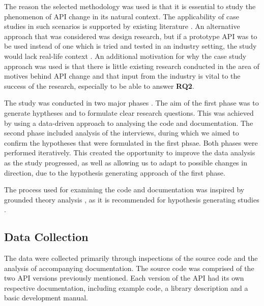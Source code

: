 \documentclass{sig-alternate}
\begin{document}
The reason the selected methodology was used is that it is essential to study the phenomenon of API change in its natural context. The applicability of case studies in such scenarios is supported by existing literature \cite{benbasat1987case, runeson2009guidelines, yin2013case, robson2002real}. An alternative approach that was considered was design research, but if a prototype API was to be used instead of one which is tried and tested in an industry setting, the study would lack real-life context \cite{runeson2009guidelines}. An additional motivation for why the case study approach was used is that there is little existing research conducted in the area of motives behind API change and that input from the industry is vital to the success of the research, especially to be able to answer \textbf{RQ2}. 

The study was conducted in two major phases \cite{andersson2007spiral}. The aim of the first phase was to generate hyptheses and to formulate clear research questions. This was achieved by using a data-driven approach to analysing the code and documentation. The second phase included analysis of the interviews, during which we aimed to confirm the hypotheses that were formulated in the first phsae. Both phases were performed iteratively. This created the opportunity to improve the data analysis as the study progressed, as well as allowing us to adapt to possible changes in direction, due to the hypothesis generating approach of the first phase. 

The process used for examining the code and documentation was inspired by grounded theory analysis \cite{seaman1999qualitative}, as it is recommended for hypothesis generating studies \cite{runeson2009guidelines, seaman1999qualitative}. 






\subsection{Data Collection} \label{data_collection}  
The data were collected primarily through inspections of the source code and the analysis of accompanying documentation. The source code was comprised of the two API versions previously mentioned. Each version of the API had its own respective documentation, including example code, a library description and a basic development manual. 
\end{document}

